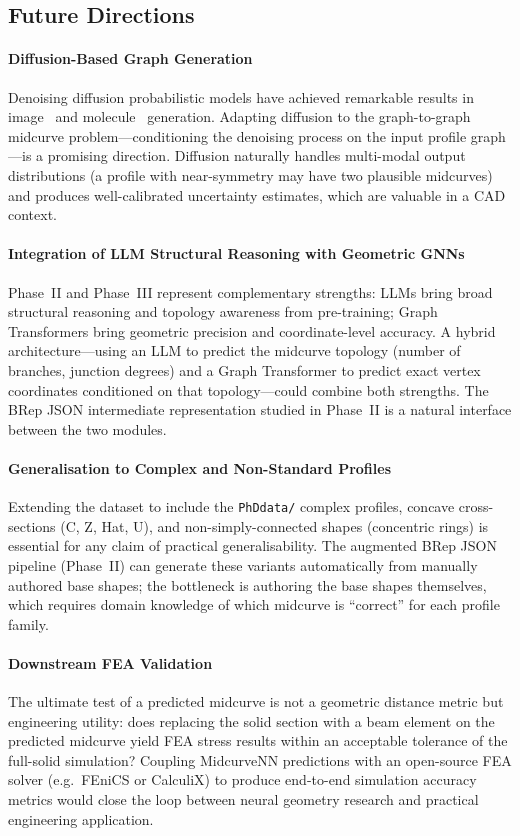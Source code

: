 \documentclass[journal]{IEEEtran}
\begin{document}
\subsection{Future Directions}

\paragraph{Diffusion-Based Graph Generation}
Denoising diffusion probabilistic models have achieved remarkable results in
image~\cite{ho2020ddpm} and molecule~\cite{hoogeboom2022edm} generation.
Adapting diffusion to the graph-to-graph midcurve problem—conditioning the
denoising process on the input profile graph—is a promising direction.
Diffusion naturally handles multi-modal output distributions (a profile with
near-symmetry may have two plausible midcurves) and produces well-calibrated
uncertainty estimates, which are valuable in a CAD context.

\paragraph{Integration of LLM Structural Reasoning with Geometric GNNs}
Phase~II and Phase~III represent complementary strengths: LLMs bring broad
structural reasoning and topology awareness from pre-training; Graph
Transformers bring geometric precision and coordinate-level accuracy.  A hybrid
architecture—using an LLM to predict the midcurve topology (number of
branches, junction degrees) and a Graph Transformer to predict exact vertex
coordinates conditioned on that topology—could combine both strengths.  The
BRep JSON intermediate representation studied in Phase~II is a natural
interface between the two modules.

\paragraph{Generalisation to Complex and Non-Standard Profiles}
Extending the dataset to include the \texttt{PhDdata/} complex profiles, concave
cross-sections (C, Z, Hat, U), and non-simply-connected shapes (concentric
rings) is essential for any claim of practical generalisability.  The augmented
BRep JSON pipeline (Phase~II) can generate these variants automatically from
manually authored base shapes; the bottleneck is authoring the base shapes
themselves, which requires domain knowledge of which midcurve is ``correct'' for
each profile family.

\paragraph{Downstream FEA Validation}
The ultimate test of a predicted midcurve is not a geometric distance metric
but engineering utility: does replacing the solid section with a beam element
on the predicted midcurve yield FEA stress results within an acceptable
tolerance of the full-solid simulation?  Coupling MidcurveNN predictions with
an open-source FEA solver (e.g.\ FEniCS or CalculiX) to produce end-to-end
simulation accuracy metrics would close the loop between neural geometry
research and practical engineering application.
\end{document}

